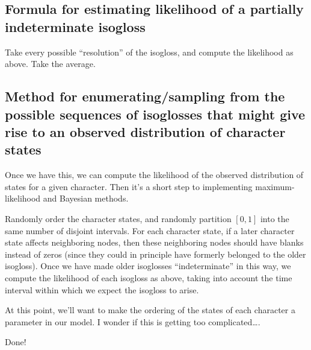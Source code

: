 \documentclass[12pt,onecolumn]{article}
\begin{document}
\subsection{Formula for estimating likelihood of a partially indeterminate isogloss}
\label{sec:org51f8765}
Take every possible “resolution” of the isogloss, and compute the likelihood as above. Take the average.
\subsection{Method for enumerating/sampling from the possible sequences of isoglosses that might give rise to an observed distribution of character states}
\label{sec:org22e00d0}
Once we have this, we can compute the likelihood of the observed distribution of states for a given character. Then it’s a short step to implementing maximum-likelihood and Bayesian methods.

Randomly order the character states, and randomly partition \([0,1]\) into the same number of disjoint intervals. For each character state, if a later character state affects neighboring nodes, then these neighboring nodes should have blanks instead of zeros (since they could in principle have formerly belonged to the older isogloss). Once we have made older isoglosses “indeterminate” in this way, we compute the likelihood of each isogloss as above, taking into account the time interval within which we expect the isogloss to arise.

At this point, we’ll want to make the ordering of the states of each character a parameter in our model. I wonder if this is getting too complicated….

Done!
\end{document}
